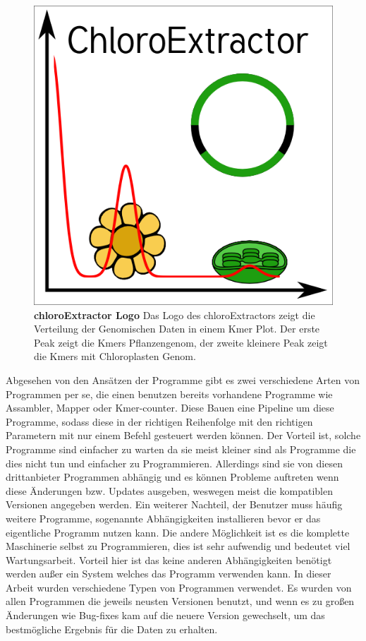 \documentclass{scrartcl}
\begin{document}
\begin{figure}
\includegraphics[width=.6\linewidth]{./logo512.png}
\caption[chloroExtractors Logo]{\textbf{chloroExtractor Logo} Das Logo des chloroExtractors zeigt die Verteilung der Genomischen Daten in einem Kmer Plot. Der erste Peak zeigt die Kmers Pflanzengenom, der zweite kleinere Peak zeigt die Kmers mit Chloroplasten Genom.}
\end{figure}
Abgesehen von den Ansätzen der Programme gibt es zwei verschiedene Arten von Programmen per se, die einen benutzen bereits vorhandene Programme wie Assambler, Mapper oder Kmer-counter. Diese 
Bauen eine Pipeline um diese Programme, sodass diese in der richtigen Reihenfolge mit den richtigen Parametern mit nur einem Befehl gesteuert werden können. Der Vorteil ist, solche Programme
sind einfacher zu warten da sie meist kleiner sind als Programme die dies nicht tun und einfacher zu Programmieren. Allerdings sind sie von diesen drittanbieter Programmen abhängig und es können Probleme 
auftreten wenn diese Änderungen bzw. Updates ausgeben, weswegen meist die kompatiblen Versionen angegeben werden. Ein weiterer Nachteil, der Benutzer muss häufig weitere Programme, sogenannte Abhängigkeiten installieren
bevor er das eigentliche Programm nutzen kann. Die andere Möglichkeit ist es die komplette Maschinerie selbst zu Programmieren, dies ist sehr aufwendig und bedeutet viel Wartungsarbeit. Vorteil hier
ist das keine anderen Abhängigkeiten benötigt werden außer ein System welches das Programm verwenden kann. In dieser Arbeit wurden verschiedene Typen von Programmen verwendet.
Es wurden von allen Programmen die jeweils neusten Versionen benutzt, und wenn es zu großen Änderungen wie Bug-fixes kam auf die neuere Version gewechselt, um das bestmögliche Ergebnis für die Daten
zu erhalten.
\end{document}
